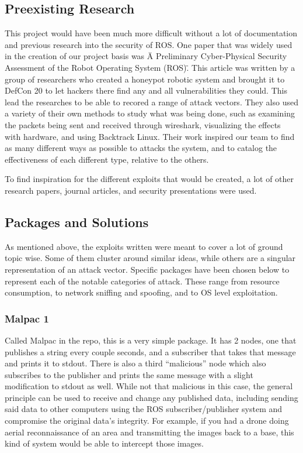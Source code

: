 \documentclass[IEEEtran,letterpaper,10pt,notitlepage,draftclsnofoot,onecolumn]{article}
\begin{document}
\subsection{Preexisting Research}
This project would have been much more difficult without a lot of documentation and previous research into the security of ROS.
One paper that was widely used in the creation of our project basis was \"A Preliminary Cyber-Physical Security Assessment of the Robot
Operating System (ROS)\". \cite{mainROS}
This article was written by a group of researchers who created a honeypot robotic system and brought it to DefCon 20 to let hackers there find any and all vulnerabilities they could.
This lead the researches to be able to recored a range of attack vectors.
They also used a variety of their own methods to study what was being done, such as examining the packets being sent and received through wireshark, visualizing the effects with hardware, and using Backtrack Linux.
Their work inspired our team to find as many different ways as possible to attacks the system, and to catalog the effectiveness of each different type, relative to the others.

To find inspiration for the different exploits that would be created, a lot of other research papers, journal articles, and security presentations were used. 

\subsection{Packages and Solutions}
As mentioned above, the exploits written were meant to cover a lot of ground topic wise.
Some of them cluster around similar ideas, while others are a singular representation of an attack vector. 
Specific packages have been chosen below to represent each of the notable categories of attack.
These range from resource consumption, to network sniffing and spoofing, and to OS level exploitation.

\subsubsection{Malpac 1}
Called Malpac in the repo, this is a very simple package. It has 2 nodes, one that publishes a string every couple seconds, and a subscriber that takes that message and prints it to stdout. 
There is also a third “malicious” node which also subscribes to the publisher and prints the same message with a slight modification to stdout as well. 
While not that malicious in this case, the general principle can be used to receive and change any published data, including sending said data to other computers using the ROS subscriber/publisher system and compromise the original data’s integrity. 
For example, if you had a drone doing aerial reconnaissance of an area and transmitting the images back to a base, this kind of system would be able to intercept those images.
\end{document}
